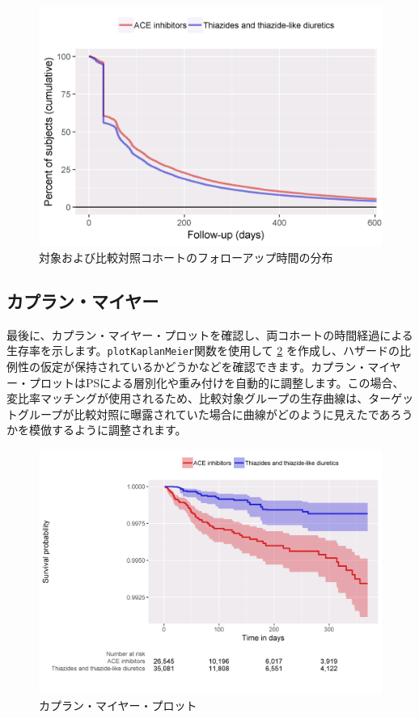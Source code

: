 \documentclass[
  11pt]{book}
\theoremstyle{definition}
\theoremstyle{definition}
\theoremstyle{definition}
\theoremstyle{definition}
\theoremstyle{remark}
\begin{document}
\begin{figure}

{\centering \includegraphics[width=0.8\linewidth]{images/PopulationLevelEstimation/followUp} 

}

\caption{対象および比較対照コホートのフォローアップ時間の分布}\label{fig:followUp}
\end{figure}

\subsection{カプラン・マイヤー}\label{ux30abux30d7ux30e9ux30f3ux30deux30a4ux30e4ux30fc}

最後に、カプラン・マイヤー・プロットを確認し、両コホートの時間経過による生存率を示します。\texttt{plotKaplanMeier}関数を使用して \ref{fig:kmPlot} を作成し、ハザードの比例性の仮定が保持されているかどうかなどを確認できます。カプラン・マイヤー・プロットはPSによる層別化や重み付けを自動的に調整します。この場合、変比率マッチングが使用されるため、比較対象グループの生存曲線は、ターゲットグループが比較対照に曝露されていた場合に曲線がどのように見えたであろうかを模倣するように調整されます。  

\begin{figure}

{\centering \includegraphics[width=1\linewidth]{images/PopulationLevelEstimation/kmPlot} 

}

\caption{カプラン・マイヤー・プロット}\label{fig:kmPlot}
\end{figure}
\end{document}
